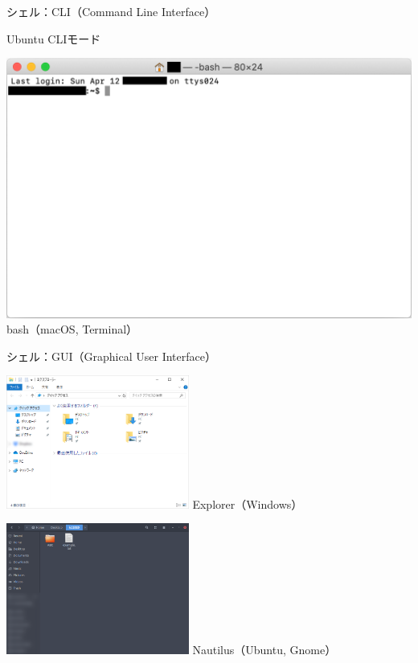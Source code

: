 \documentclass[12pt,aspectratio=169]{beamer}
\begin{document}
\begin{frame}{シェル：CLI（Command Line Interface）}
\begin{minipage}{0.3\textwidth}
    Ubuntu CLIモード
  \end{minipage}
  \hfill
  \begin{minipage}{0.3\textwidth}
    \vspace{-5\baselineskip}
    \includegraphics[width=2.0\linewidth,bb=0 0 1144 735]{./images/mac-basic.png}
    bash（macOS, Terminal）
  \end{minipage}

\end{frame}


\begin{frame}{シェル：GUI（Graphical User Interface）}

  \begin{minipage}{0.45\textwidth}
    \includegraphics[width=6cm,bb=0 0 659 481]{./images/explorer.png}
    Explorer（Windows）
  \end{minipage}
  \hfill
  \begin{minipage}{0.45\textwidth}
    \includegraphics[width=6cm,bb=0 0 892 640]{./images/nautilus.png}
    Nautilus（Ubuntu, Gnome）
  \end{minipage}

\end{frame}
\end{document}
